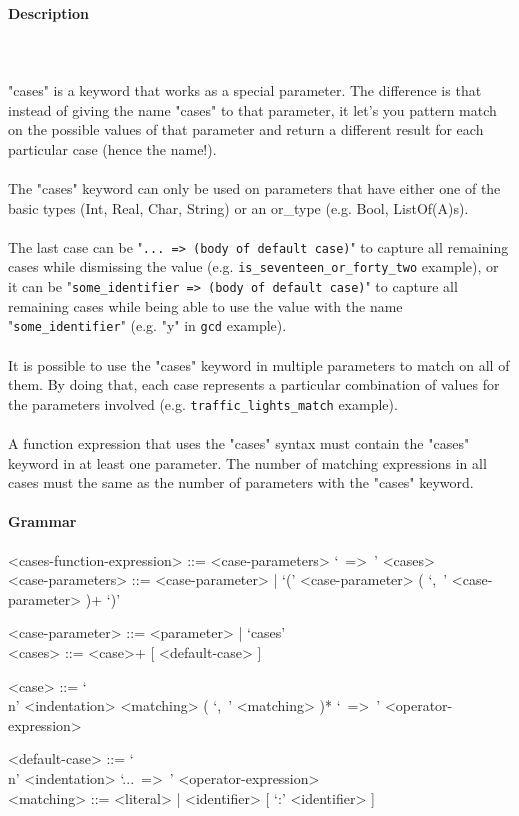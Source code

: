 \documentclass{article}
\def\pend{\mbox{} \\\\}
\begin{document}
\paragraph{Description}\pend
"cases" is a keyword that works as a special parameter. The difference is that 
instead of giving the name "cases" to that parameter, it let's you 
pattern match on the possible values of that parameter and return a different
result for each particular case (hence the name!). 
\\\\
The "cases" keyword can only be used on parameters that have either one of the 
basic types (Int, Real, Char, String) or an or\_type (e.g. Bool, ListOf(A)s).
\\\\
The last case can be "\texttt{... => (body of default case)}" to capture all
remaining cases while dismissing the value (e.g.
\texttt{is_seventeen_or_forty_two} example), or it can be
"\texttt{some_identifier => (body of default case)}" to capture all remaining
cases while being able to use the value with the name "\texttt{some_identifier}"
(e.g.  "y" in \texttt{gcd} example).
\\\\
It is possible to use the "cases" keyword in multiple parameters to match on all
of them. By doing that, each case represents a particular combination of values
for the parameters involved (e.g. \texttt{traffic_lights_match} example).
\\\\
A function expression that uses the "cases" syntax must contain the "cases"
keyword in at least one parameter. The number of matching expressions in 
all cases must the same as the number of parameters with the "cases" keyword.

\paragraph{Grammar}
\begin{grammar}
<cases-function-expression> ::= <case-parameters> `\ =>\ ' <cases> \\

<case-parameters> ::=
<case-parameter> | `(' <case-parameter> ( `,\ ' <case-parameter> )+ `)'

<case-parameter> ::= <parameter> | `cases'\\

<cases> ::= <case>+ [ <default-case> ]

<case> ::=
`\\n' <indentation> <matching> ( `,\ ' <matching> )* `\ =>\ ' <operator-expression>

<default-case> ::= `\\n' <indentation> `...\ =>\ ' <operator-expression>\\

<matching> ::= <literal> | <identifier> [ `:' <identifier> ]
\end{grammar}
\end{document}
